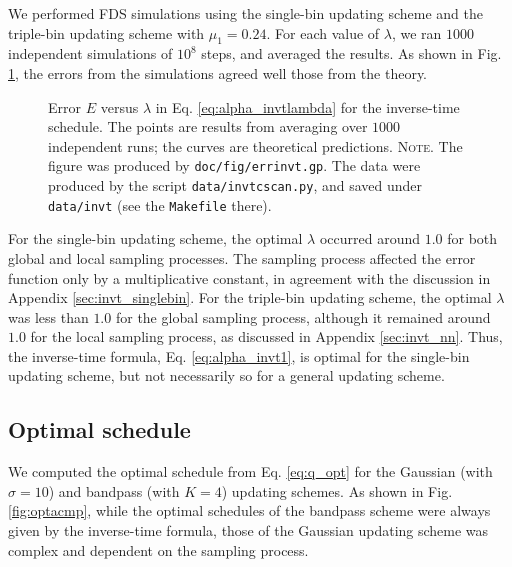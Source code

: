 \documentclass[reprint, floatfix]{revtex4-1}
\newcommand{\note}[1]{{\color{DarkGreen}\footnotesize \textsc{Note.} #1}}
\begin{document}
We performed FDS simulations
using the single-bin updating scheme
and the triple-bin updating scheme with $\mu_1 = 0.24$.
%
For each value of $\lambda$, we ran $1000$ independent simulations
of $10^8$ steps, and averaged the results.
%
As shown in Fig. \ref{fig:errinvt},
the errors from the simulations
agreed well those from the theory.


\begin{figure}[h]
\begin{center}
  \caption{
    \label{fig:errinvt}
    Error $E$ versus $\lambda$
    in Eq. \eqref{eq:alpha_invtlambda}
    for the inverse-time schedule.
    The points are results from averaging over $1000$ independent runs;
    the curves are theoretical predictions.
    \note{The figure was produced by \texttt{doc/fig/errinvt.gp}.
      The data were produced by the script \texttt{data/invtcscan.py},
      and saved under \texttt{data/invt}
      (see the \texttt{Makefile} there).
    }%
  }
\end{center}
\end{figure}

For the single-bin updating scheme,
the optimal $\lambda$ occurred around $1.0$
for both global and local sampling processes.
%
The sampling process affected the error function
only by a multiplicative constant,
in agreement with the discussion in
Appendix \ref{sec:invt_singlebin}.
%
For the triple-bin updating scheme,
the optimal $\lambda$ was less than $1.0$
for the global sampling process,
although it remained around $1.0$
for the local sampling process,
as discussed in Appendix \ref{sec:invt_nn}.
%
Thus, the inverse-time formula,
Eq. \eqref{eq:alpha_invt1},
is optimal for the single-bin updating scheme,
but not necessarily so for a general updating scheme.





\subsection{\label{sec:results_optschedule}
Optimal schedule}



We computed the optimal schedule from Eq. \eqref{eq:q_opt}
for the Gaussian (with $\sigma = 10$)
and bandpass (with $K = 4$) updating schemes.
%
As shown in Fig. \ref{fig:optacmp},
while the optimal schedules of the bandpass scheme
were always given by the inverse-time formula,
those of the Gaussian updating scheme was complex
and dependent on the sampling process.
\end{document}
